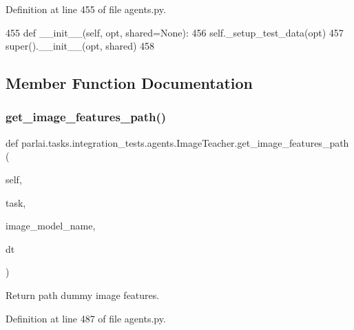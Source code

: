Definition at line 455 of file agents.\+py.


\begin{DoxyCode}
455     \textcolor{keyword}{def }\_\_init\_\_(self, opt, shared=None):
456         self.\_setup\_test\_data(opt)
457         super().\_\_init\_\_(opt, shared)
458 
\end{DoxyCode}


\subsection{Member Function Documentation}
\mbox{\label{classparlai_1_1tasks_1_1integration__tests_1_1agents_1_1ImageTeacher_a73c89a1d9f05891ad2a749c81814b93e}} 
\subsubsection{\texorpdfstring{get\+\_\+image\+\_\+features\+\_\+path()}{get\_image\_features\_path()}}
{\footnotesize\ttfamily def parlai.\+tasks.\+integration\+\_\+tests.\+agents.\+Image\+Teacher.\+get\+\_\+image\+\_\+features\+\_\+path (\begin{DoxyParamCaption}\item[{}]{self,  }\item[{}]{task,  }\item[{}]{image\+\_\+model\+\_\+name,  }\item[{}]{dt }\end{DoxyParamCaption})}

\begin{DoxyVerb}Return path dummy image features.
\end{DoxyVerb}
 

Definition at line 487 of file agents.\+py.


